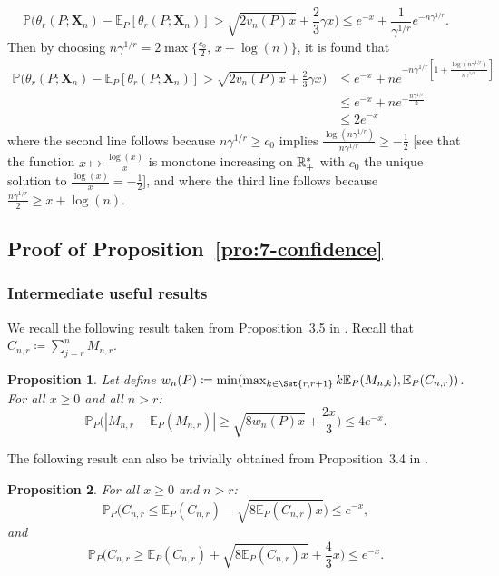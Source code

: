 \documentclass{article}
\newtheorem{proposition}{Proposition}
\newcommand{\1}{\boldsymbol{1}}
\newcommand{\EE}{\mathbb{E}}
\newcommand{\PP}{\mathbb{P}}
\theoremstyle{plain}
\begin{document}
  \begin{equation*}
    \PP\big( \theta_r(P;\mathbf{X}_n) - \EE_P[\theta_r(P;\mathbf{X}_n)]> \sqrt{2v_n(P)x} + \frac{2}{3}\gamma x \big)%
    \leq e^{-x} + \frac{1}{\gamma^{1/r}}e^{-n\gamma^{1/r}}.
  \end{equation*}
  Then by choosing $n\gamma^{1/r} = 2\max\{\frac{c_0}{2},\,x + \log(n)\}$, it is found that
  \begin{align*}
    \PP\Big( \theta_r(P;\mathbf{X}_n) - \EE_P[\theta_r(P;\mathbf{X}_n)]> \sqrt{2v_n(P)x} + \frac{2}{3}\gamma x \Big)%
    &\leq e^{-x} + ne^{-n\gamma^{1/r}[1 + \frac{\log(n\gamma^{1/r})}{n\gamma^{1/r}}]}\\
    &\leq e^{-x} + ne^{-\frac{n\gamma^{1/r}}{2}}\\
    &\leq 2e^{-x}
  \end{align*}
  where the second line follows because $n\gamma^{1/r} \geq c_0$ implies $\frac{\log(n\gamma^{1/r})}{n\gamma^{1/r}} \geq -\frac{1}{2}$ [see that the function $x\mapsto \frac{\log(x)}{x}$ is monotone increasing on $\mathbb{R}_{+}^{*}$ with $c_0$ the unique solution to $\frac{\log(x)}{x} = -\frac{1}{2}$], and where the third line follows because $\frac{n\gamma^{1/r}}{2} \geq x + \log(n)$.

\subsection{Proof of Proposition~\ref{pro:7-confidence}}
\label{sec:proof-pro:confidence}

\subsubsection{Intermediate useful results}

We recall the following result taken from Proposition~3.5 in \cite{Ben(17)}. Recall that $C_{n,r} \coloneqq \sum_{j=r}^nM_{n,r}$.
\begin{proposition}
  \label{pro:2}
  Let define $w_n(P) \coloneqq \min( \max_{k\in\Set{r,r+1}}k\EE_P(M_{n,k}) ,\EE_P(C_{n,r}))$. For all $x\geq 0$ and all $n > r$:
  \begin{equation*}
    \PP_P\Big( |M_{n,r} - \EE_P(M_{n,r})| \geq \sqrt{8w_n(P)x} + \frac{2x}{3} \Big) \leq 4e^{-x}.
  \end{equation*}
\end{proposition}


The following result can also be trivially obtained from Proposition~3.4 in \cite{Ben(17)}.
\begin{proposition}
  \label{pro:3}
  For all $x\geq 0$ and $n > r$:
  \begin{equation*}
    \PP_P\Big( C_{n,r} \leq \EE_P(C_{n,r}) - \sqrt{8\EE_P(C_{n,r})x} \Big)%
    \leq e^{-x},
  \end{equation*}
  and
  \begin{equation*}
    \PP_P\Big( C_{n,r} \geq \EE_P(C_{n,r}) + \sqrt{8\EE_P(C_{n,r})x} + \frac{4}{3}x \Big)%
    \leq e^{-x}.
  \end{equation*}
\end{proposition}
\end{document}
